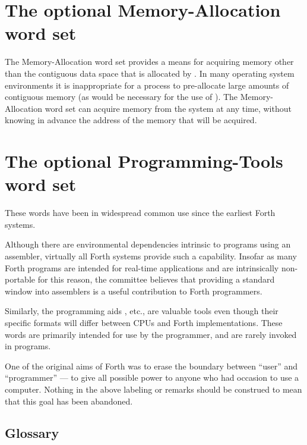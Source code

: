 

\section{The optional Memory-Allocation word set} %
\label{rat:memory}

The Memory-Allocation word set provides a means for acquiring memory
other than the contiguous data space that is allocated by .
In many operating system environments it is inappropriate for a process
to pre-allocate large amounts of contiguous memory (as would be
necessary for the use of ).  The Memory-Allocation word set
can acquire memory from the system at any time, without knowing in
advance the address of the memory that will be acquired.


\section{The optional Programming-Tools word set} %
\label{rat:tools}

These words have been in widespread common use since the earliest
Forth systems.

Although there are environmental dependencies intrinsic to programs
using an assembler, virtually all Forth systems provide such a
capability. Insofar as many Forth programs are intended for real-time
applications and are intrinsically non-portable for this reason, the
committee believes that providing a standard window into
assemblers is a useful contribution to Forth programmers.

Similarly, the programming aids , etc., are valuable tools
even though their specific formats will differ between CPUs and Forth
implementations. These words are primarily intended for use by the
programmer, and are rarely invoked in programs.

One of the original aims of Forth was to erase the boundary between
``user'' and ``programmer'' --- to give all possible power to anyone
who had occasion to use a computer. Nothing in the above labeling or
remarks should be construed to mean that this goal has been abandoned.

\setcounter{subsection}{5}
\subsection{Glossary} %

